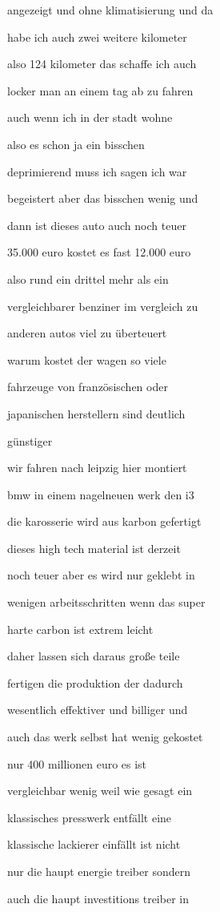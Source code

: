 \documentclass[a4paper, 11pt]{book} %
\begin{document}
angezeigt und ohne klimatisierung und da

habe ich auch zwei weitere kilometer

also 124 kilometer das schaffe ich auch

locker man an einem tag ab zu fahren

auch wenn ich in der stadt wohne

also es schon ja ein bisschen

deprimierend muss ich sagen ich war

begeistert aber das bisschen wenig und

dann ist dieses auto auch noch teuer

35.000 euro kostet es fast 12.000 euro

also rund ein drittel mehr als ein

vergleichbarer benziner im vergleich zu

anderen autos viel zu überteuert

warum kostet der wagen so viele

fahrzeuge von französischen oder

japanischen herstellern sind deutlich

günstiger

wir fahren nach leipzig hier montiert

bmw in einem nagelneuen werk den i3

die karosserie wird aus karbon gefertigt

dieses high tech material ist derzeit

noch teuer aber es wird nur geklebt in

wenigen arbeitsschritten wenn das super

harte carbon ist extrem leicht

daher lassen sich daraus große teile

fertigen die produktion der dadurch

wesentlich effektiver und billiger und

auch das werk selbst hat wenig gekostet

nur 400 millionen euro es ist

vergleichbar wenig weil wie gesagt ein

klassisches presswerk entfällt eine

klassische lackierer einfällt ist nicht

nur die haupt energie treiber sondern

auch die haupt investitions treiber in
\end{document}
